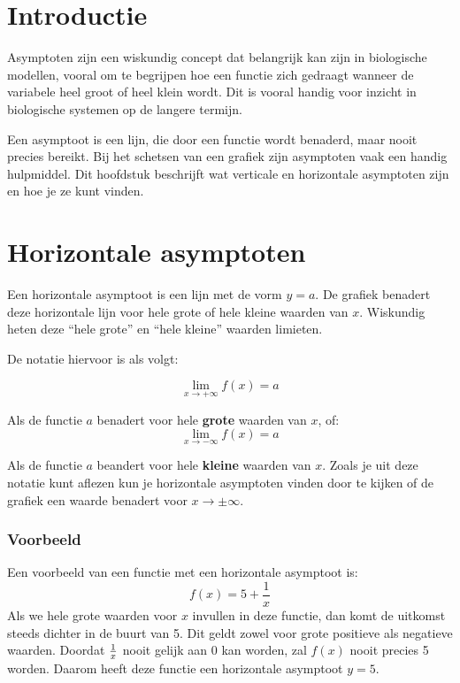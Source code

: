 \documentclass[
  a4paper,
]{scrbook}
\theoremstyle{definition}
\theoremstyle{remark}
\begin{document}
\section{Introductie}\label{introductie-3}

Asymptoten zijn een wiskundig concept dat belangrijk kan zijn in
biologische modellen, vooral om te begrijpen hoe een functie zich
gedraagt wanneer de variabele heel groot of heel klein wordt. Dit is
vooral handig voor inzicht in biologische systemen op de langere
termijn.

Een asymptoot is een lijn, die door een functie wordt benaderd, maar
nooit precies bereikt. Bij het schetsen van een grafiek zijn asymptoten
vaak een handig hulpmiddel. Dit hoofdstuk beschrijft wat verticale en
horizontale asymptoten zijn en hoe je ze kunt vinden.

\section{Horizontale asymptoten}\label{horizontale-asymptoten}

Een horizontale asymptoot is een lijn met de vorm \(y=a\). De grafiek
benadert deze horizontale lijn voor hele grote of hele kleine waarden
van \(x\). Wiskundig heten deze ``hele grote'' en ``hele kleine''
waarden limieten.

De notatie hiervoor is als volgt:

\[\lim_{x \rightarrow +\infty}{f(x)} = a\]

Als de functie \(a\) benadert voor hele \textbf{grote} waarden van
\(x\), of: \[\lim_{x \rightarrow -\infty}{f(x)} = a\]

Als de functie \(a\) beandert voor hele \textbf{kleine} waarden van
\(x\). Zoals je uit deze notatie kunt aflezen kun je horizontale
asymptoten vinden door te kijken of de grafiek een waarde benadert voor
\(x \rightarrow \pm \infty\).

\subsubsection*{Voorbeeld}\label{voorbeeld}

Een voorbeeld van een functie met een horizontale asymptoot is:
\[f(x) = 5 + \frac{1}{x}\] Als we hele grote waarden voor \(x\) invullen
in deze functie, dan komt de uitkomst steeds dichter in de buurt van 5.
Dit geldt zowel voor grote positieve als negatieve waarden. Doordat
\(1\over x\) nooit gelijk aan 0 kan worden, zal \(f(x)\) nooit precies 5
worden. Daarom heeft deze functie een horizontale asymptoot \(y = 5\).
\end{document}

